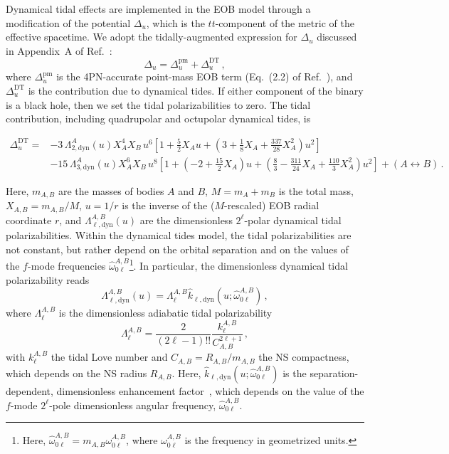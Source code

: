 \documentclass[prd,aps,letter,twocolumn,floatfix,notitlepage,nofootinbib]{revtex4-1}
\begin{document}
Dynamical tidal effects are implemented in the EOB model through a modification of the potential $\Delta_u$, which is the $tt$-component of the metric of the effective spacetime. We adopt the tidally-augmented expression for $\Delta_u$ discussed in Appendix~A of Ref.~\cite{Steinhoff:2016rfi}:
\begin{equation}
\Delta_u = \Delta_u^{\textrm{pm}} + \Delta_u^{\textrm{DT}}\,,
\end{equation}
where $\Delta_u^{\textrm{pm}}$ is the 4PN-accurate point-mass EOB term (Eq.~(2.2) of Ref.~\cite{Bohe:2016gbl}), and $\Delta_u^{\textrm{DT}}$ is the contribution due to dynamical tides. If either component of the binary is a black hole, then we set the tidal polarizabilities to zero. The tidal contribution, including quadrupolar and octupolar dynamical tides, is
\begin{widetext}
\begin{align}
 \Delta_u^{\textrm{DT}} =&  - 3\,\Lambda_{2,\textrm{dyn}}^{A}(u)X_A^4 X_B\,u^6  \left[ 1 + \frac{5}{2} X_Au + \left(3 + \frac{1}{8}X_A + \frac{337}{28} X_A^2\right)u^2 \right]\nonumber\\
 &- 15\,\Lambda_{3,\textrm{dyn}}^{A}(u)X_A^6X_B\,u^8 \left[1 + \left(-2 + \frac{15}{2}X_A\right)u + \left(\frac{8}{3} - \frac{311}{24}X_A + \frac{110}{3}X_A^2\right) u^2\right] + (A \leftrightarrow B)\,.
\end{align}
\end{widetext}
Here, $m_{A,B}$ are the masses of bodies $A$ and $B$, $M = m_A + m_B$ is the total mass, $X_{A,B}=m_{A,B}/M$, $u=1/r$ is the inverse of the ($M$-rescaled) EOB radial coordinate $r$, and $\Lambda_{\ell,\textrm{dyn}}^{A,B}(u)$ are the dimensionless $2^{\ell}$-polar dynamical tidal polarizabilities. Within the dynamical tides model, the tidal polarizabilities are not constant, but rather depend on the orbital separation and on the values of the $f$-mode frequencies $\hat{\omega}_{0\ell}^{A,B}$\footnote{Here, $\hat{\omega}_{0\ell}^{A,B}=m_{A,B}\omega_{0\ell}^{A,B}$, where $\omega_{0\ell}^{A,B}$ is the frequency in geometrized units.}. In particular, the dimensionless dynamical tidal polarizability reads
\begin{equation}
\Lambda_{\ell,\textrm{dyn}}^{A,B}(u)=\Lambda_{\ell}^{A,B}\hat{k}_{\ell, \textrm{dyn}}(u;\hat{\omega}_{0\ell}^{A,B})\,,
\end{equation}
where $\Lambda_{\ell}^{A,B}$ is the dimensionless adiabatic tidal polarizability
\begin{equation}
\Lambda_{\ell}^{A,B}=\frac{2}{(2\ell-1)!!}\frac{k^{A,B}_{\ell}}{C_{A,B}^{2\ell+1}}\,,
\end{equation}
with $k^{A,B}_{\ell}$ the tidal Love number and $C_{A,B}=R_{A,B}/m_{A,B}$ the NS compactness, which depends on the NS radius $R_{A,B}$. Here, $\hat{k}_{\ell, \textrm{dyn}}(u;\hat{\omega}_{0\ell}^{A,B})$ is the separation-dependent, dimensionless enhancement factor~\cite{Steinhoff:2016rfi, Dietrich:2017feu}, which depends on the value of the $f$-mode $2^\ell$-pole dimensionless angular frequency, $\hat{\omega}_{0\ell}^{A,B}$.
\end{document}
